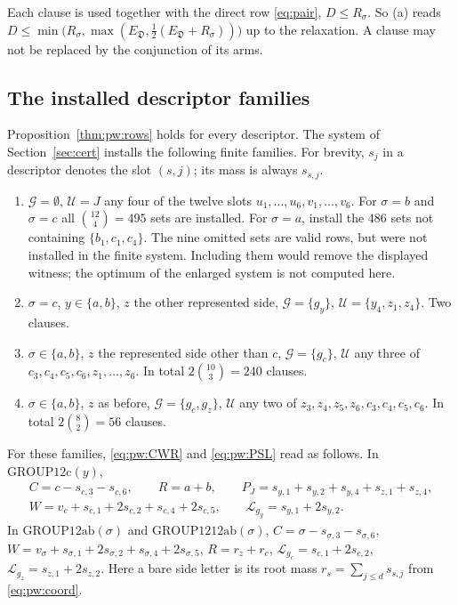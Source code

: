 \documentclass{amsart}
\theoremstyle{definition}
\theoremstyle{plain}
\numberwithin{equation}{section}
\numberwithin{table}{section}
\begin{document}
Each clause is used together with the direct row \eqref{eq:pair},
$D\le R_\sigma$. So (a) reads
$D\le\min\bigl(R_\sigma,\max(E_{\mathfrak D},\tfrac12(E_{\mathfrak D}+R_\sigma))\bigr)$ up to the
relaxation. A clause may not be replaced by the conjunction of its arms.

\subsection{The installed descriptor families}\label{sec:pow3:families}

Proposition~\ref{thm:pw:rows} holds for every descriptor. The system of
Section~\ref{sec:cert} installs the following finite families. For brevity,
$s_j$ in a descriptor denotes the slot $(s,j)$; its mass is always $s_{s,j}$.

\begin{enumerate}
\item[$\mathrm{POW3}(\sigma)$.] $\mathcal G=\emptyset$, $\mathcal U=J$ any
four of the twelve slots $u_1,\dots,u_6,v_1,\dots,v_6$. For $\sigma=b$ and
$\sigma=c$ all $\binom{12}4=495$ sets are installed. For $\sigma=a$, install
the $486$ sets not containing $\{b_1,c_1,c_4\}$. The nine omitted sets are
valid rows, but were not installed in the finite system. Including them would
remove the displayed witness; the optimum of the enlarged system is not
computed here.
\item[$\mathrm{GROUP12c}(y)$.] $\sigma=c$, $y\in\{a,b\}$, $z$ the other
 represented side, $\mathcal G=\{g_y\}$, $\mathcal U=\{y_4,z_1,z_4\}$. Two
clauses.
\item[$\mathrm{GROUP12ab}(\sigma)$.] $\sigma\in\{a,b\}$, $z$ the represented
 side other than $c$, $\mathcal G=\{g_c\}$, $\mathcal U$ any three of
$c_3,c_4,c_5,c_6,z_1,\dots,z_6$. In total $2\binom{10}3=240$ clauses.
\item[$\mathrm{GROUP1212ab}(\sigma)$.] $\sigma\in\{a,b\}$, $z$ as before,
$\mathcal G=\{g_c,g_z\}$, $\mathcal U$ any two of
$z_3,z_4,z_5,z_6,c_3,c_4,c_5,c_6$. In total $2\binom82=56$ clauses.
\end{enumerate}

For these families, \eqref{eq:pw:CWR} and \eqref{eq:pw:PSL} read as follows.
In $\mathrm{GROUP12c}(y)$,
\[
 \begin{gathered}
 C=c-s_{c,3}-s_{c,6},\qquad R=a+b,\qquad
 P_J=s_{y,1}+s_{y,2}+s_{y,4}+s_{z,1}+s_{z,4},\\
 W=v_c+s_{c,1}+2s_{c,2}+s_{c,4}+2s_{c,5},\qquad
 \mathcal L_{g_y}=s_{y,1}+2s_{y,2}.
 \end{gathered}
\]
In $\mathrm{GROUP12ab}(\sigma)$ and $\mathrm{GROUP1212ab}(\sigma)$,
$C=\sigma-s_{\sigma,3}-s_{\sigma,6}$,
$W=v_\sigma+s_{\sigma,1}+2s_{\sigma,2}+s_{\sigma,4}+2s_{\sigma,5}$,
$R=r_z+r_c$, $\mathcal L_{g_c}=s_{c,1}+2s_{c,2}$, $\mathcal L_{g_z}=s_{z,1}+2s_{z,2}$. Here a
bare side letter is its root mass $r_s=\sum_{j\le d}s_{s,j}$ from
\eqref{eq:pw:coord}.
\end{document}
